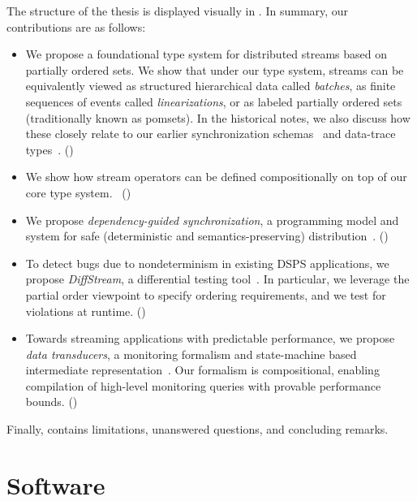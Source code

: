 The structure of the thesis is displayed visually in .
In summary, our contributions are as follows:

\begin{itemize}
\item
We propose a foundational type system for distributed streams based on partially ordered sets.
We show that under our type system, streams can be equivalently viewed as
structured hierarchical data called \emph{batches},
as finite sequences of events called \emph{linearizations},
or as labeled partially ordered sets (traditionally known as pomsets).
In the historical notes, we also discuss how these closely relate to
our earlier synchronization schemas~ and data-trace types~.
()

\item
We show how stream operators can be defined compositionally on top of our core type system.~ ()

\item
We propose \emph{dependency-guided synchronization},
a programming model and system for safe (deterministic and semantics-preserving) distribution~.
()

\item
To detect bugs due to nondeterminism in existing DSPS applications,
we propose \emph{DiffStream}, a differential testing tool~.
In particular, we leverage the partial order viewpoint to specify
ordering requirements, and we test for violations at runtime.
()

\item
Towards streaming applications with predictable performance,
we propose \emph{data transducers}, a monitoring formalism and state-machine based intermediate representation~.
Our formalism is compositional, enabling compilation of high-level
monitoring queries with provable performance bounds.
()
\end{itemize}

Finally, 
contains limitations, unanswered questions, and concluding remarks.

\section{Software}

